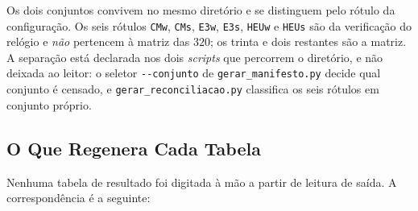 Os dois conjuntos convivem no mesmo diretório e se distinguem pelo rótulo da
configuração. Os seis rótulos \texttt{CMw}, \texttt{CMs}, \texttt{E3w}, \texttt{E3s},
\texttt{HEUw} e \texttt{HEUs} são da verificação do relógio e \emph{não} pertencem à
matriz das $320$; os trinta e dois restantes são a matriz. A separação está declarada
nos dois \textit{scripts} que percorrem o diretório, e não deixada ao leitor: o
seletor \texttt{-{}-conjunto} de \texttt{gerar\_manifesto.py} decide qual conjunto é
censado, e \texttt{gerar\_reconciliacao.py} classifica os seis rótulos em conjunto
próprio.

\subsection{O Que Regenera Cada Tabela}

Nenhuma tabela de resultado foi digitada à mão a partir de leitura de saída. A
correspondência é a seguinte:

